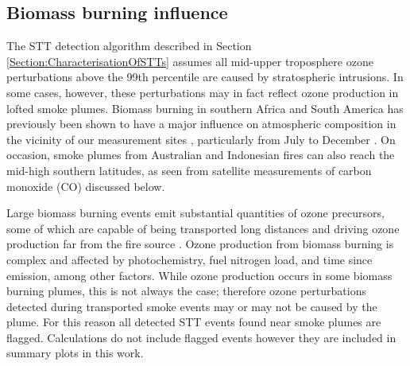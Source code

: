   \subsection{Biomass burning influence}
  \label{Section:BiomassBurning}
    The STT detection algorithm described in Section \ref{Section:CharacterisationOfSTTs} assumes all mid-upper troposphere ozone perturbations above the 99th percentile are caused by stratospheric intrusions. 
    In some cases, however, these perturbations may in fact reflect ozone production in lofted smoke plumes.
    Biomass burning in southern Africa and South America has previously been shown to have a major influence on atmospheric composition in the vicinity of our measurement sites \citep{Oltmans2001, Gloudemans2006, Edwards2006}, particularly from July to December \citep{Pak2003, Liu2016}.
    On occasion, smoke plumes from Australian and Indonesian fires can also reach the mid-high southern latitudes, as seen from satellite measurements of carbon monoxide (CO) discussed below. %
    
    Large biomass burning events emit substantial quantities of ozone precursors, some of which are capable of being transported long distances and driving ozone production far from the fire source \citep{Jaffe2012}.
    Ozone production from biomass burning is complex and affected by photochemistry, fuel nitrogen load, and time since emission, among other factors. 
    While ozone production occurs in some biomass burning plumes, this is not always the case; therefore ozone perturbations detected during transported smoke events may or may not be caused by the plume.
    For this reason all detected STT events found near smoke plumes are flagged.
    Calculations do not include flagged events however they are included in summary plots in this work.
    
    
